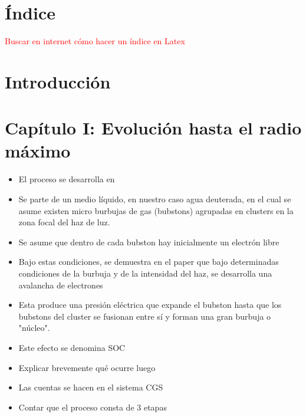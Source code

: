\documentclass[aps,prb,twocolumn,superscriptaddress,floatfix,longbibliography,10pt]{revtex4-2}
\newif\ifptitle
\newif\ifpnumber
\newcounter{para}
\newcommand\ptitle[1]{\par\refstepcounter{para}
{\ifpnumber{\noindent\textcolor{lightgray}{\textbf{\thepara}}\indent}\fi}
{\ifptitle{\textbf{[{#1}]}}\fi}}
\begin{document}
\maketitle

\section*{Índice}
\textcolor{red}{Buscar en internet cómo hacer un índice en Latex}

\section*{Introducción}


















\section{Capítulo I: Evolución hasta el radio máximo}

\ptitle{Resumen del capítulo. En este capítulo se discute el proceso a partir del cual un láser incidente en un medio líquido es capaz de producir una burbuja de cavitación}
\begin{itemize}
  \item El proceso se desarrolla en \cite{Bunkin1993}
  \item Se parte de un medio líquido, en nuestro caso agua deuterada, en el cual se asume existen micro burbujas de gas (bubstons) agrupadas en clusters en la zona focal del haz de luz. 
  \item Se asume que dentro de cada bubston hay inicialmente un electrón libre
  \item Bajo estas condiciones, se demuestra en el paper que bajo determinadas condiciones de la burbuja y de la intensidad del haz, se desarrolla una avalancha de electrones
  \item Esta produce una presión eléctrica que expande el bubston hasta que los bubstons del cluster se fusionan entre sí y forman una gran burbuja o "núcleo". 
  \item Este efecto se denomina SOC
  \item Explicar brevemente qué ocurre luego
  \item Las cuentas se hacen en el sistema CGS
  \item Contar que el proceso consta de 3 etapas

\end{itemize}
\end{document}
